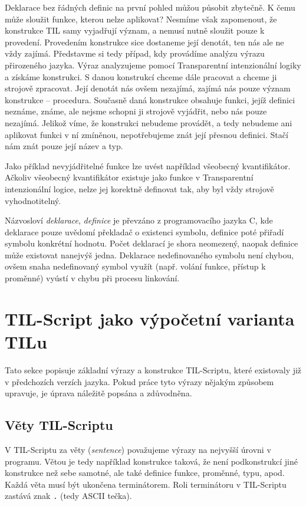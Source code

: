 Deklarace bez řádných definic na první pohled můžou působit zbytečně. K čemu může sloužit funkce,
kterou nelze aplikovat? Nesmíme však zapomenout, že konstrukce TIL samy vyjadřují význam, a nemusí
nutně sloužit pouze k provedení. Provedením konstrukce sice dostaneme její denotát, ten nás ale ne
vždy zajímá. Představme si tedy případ, kdy provádíme analýzu výrazu přirozeného jazyka. Výraz
analyzujeme pomocí Transparentní intenzionální logiky a získáme konstrukci. S danou konstrukcí
chceme dále pracovat a chceme ji strojově zpracovat. Její denotát nás ovšem nezajímá, zajímá nás
pouze význam konstrukce -- procedura. Současně daná konstrukce obsahuje funkci, jejíž definici
neznáme, známe, ale nejsme schopni ji strojově vyjádřit, nebo nás pouze nezajímá. Jelikož víme,
že konstrukci nebudeme provádět, a tedy nebudeme ani aplikovat funkci v ní zmíněnou, nepotřebujeme
znát její přesnou definici. Stačí nám znát pouze její název a typ.

Jako příklad nevyjádřitelné funkce lze uvést například všeobecný kvantifikátor. Ačkoliv všeobecný
kvantifikátor existuje jako funkce v Transparentní intenzionální logice, nelze jej korektně
definovat tak, aby byl vždy strojově vyhodnotitelný.

Názvosloví \textit{deklarace}, \textit{definice} je převzáno z programovacího jazyka C, kde
deklarace pouze uvědomí překladač o existenci symbolu, definice poté přiřadí symbolu konkrétní
hodnotu. Počet deklarací je shora neomezený, naopak definice může existovat nanejvýš jedna.
Deklarace nedefinovaného symbolu není chybou, ovšem snaha nedefinovaný symbol využít (např. volání
funkce, přístup k proměnné) vyústí v chybu při procesu linkování.

\section{TIL-Script jako výpočetní varianta TILu}

Tato sekce popisuje základní výrazy a konstrukce TIL-Scriptu, které existovaly již v předchozích
verzích jazyka. Pokud práce tyto výrazy nějakým způsobem upravuje, je úprava náležitě popsána
a zdůvodněna.

\subsection{Věty TIL-Scriptu}

V TIL-Scriptu za věty (\textit{sentence}) považujeme výrazy na nejvyšší úrovni v programu. Větou je
tedy například konstrukce taková, že není podkonstrukcí jiné konstrukce než sebe samotné, ale také
definice funkce, proměnné, typu, apod. Každá věta musí být ukončena terminátorem. Roli terminátoru
v TIL-Scriptu zastává znak \lstinline{.} (tedy ASCII tečka).

